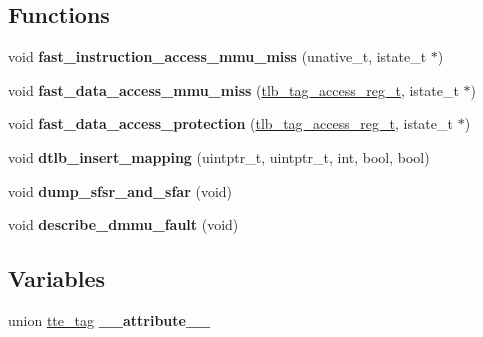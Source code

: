 \subsection*{Functions}
\begin{DoxyCompactItemize}
\item 
\mbox{\label{group__RTEMSBSPsSPARC64mm_ga11bdbd242c75bf9636aab10581c2e683}} 
void {\bfseries fast\+\_\+instruction\+\_\+access\+\_\+mmu\+\_\+miss} (unative\+\_\+t, istate\+\_\+t $\ast$)
\item 
\mbox{\label{group__RTEMSBSPsSPARC64mm_ga218d270d19bcf944716855bff601582b}} 
void {\bfseries fast\+\_\+data\+\_\+access\+\_\+mmu\+\_\+miss} (\mbox{\hyperlink{uniontlb__tag__read__reg}{tlb\+\_\+tag\+\_\+access\+\_\+reg\+\_\+t}}, istate\+\_\+t $\ast$)
\item 
\mbox{\label{group__RTEMSBSPsSPARC64mm_ga03ce772f462cbe39db865f5c6fdc8999}} 
void {\bfseries fast\+\_\+data\+\_\+access\+\_\+protection} (\mbox{\hyperlink{uniontlb__tag__read__reg}{tlb\+\_\+tag\+\_\+access\+\_\+reg\+\_\+t}}, istate\+\_\+t $\ast$)
\item 
\mbox{\label{group__RTEMSBSPsSPARC64mm_ga513f2db5f94330295d5a83c7bc4e38db}} 
void {\bfseries dtlb\+\_\+insert\+\_\+mapping} (uintptr\+\_\+t, uintptr\+\_\+t, int, bool, bool)
\item 
\mbox{\label{group__RTEMSBSPsSPARC64mm_ga6f2275df8105e889adeeac93a6603c2c}} 
void {\bfseries dump\+\_\+sfsr\+\_\+and\+\_\+sfar} (void)
\item 
\mbox{\label{group__RTEMSBSPsSPARC64mm_ga9106121bb5cd9337dddcd564b1542f6c}} 
void {\bfseries describe\+\_\+dmmu\+\_\+fault} (void)
\end{DoxyCompactItemize}
\subsection*{Variables}
\begin{DoxyCompactItemize}
\item 
\mbox{\label{group__RTEMSBSPsSPARC64mm_ga5f3a3dc744285f776210e30fcb7041f1}} 
union \mbox{\hyperlink{uniontte__tag}{tte\+\_\+tag}} {\bfseries \+\_\+\+\_\+attribute\+\_\+\+\_\+}
\end{DoxyCompactItemize}


